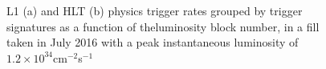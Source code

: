 \documentclass[a4paper, oneside]{book}
\begin{document}
					\begin{figure}[h!]
						\centering
						 \quad
						\caption{L1 (a) and HLT (b) physics trigger rates grouped by trigger signatures as a function of theluminosity block number, in a fill taken in July 2016 with a peak instantaneous luminosity of $1.2 \times 10^{34}$cm$^{-2}$s$^{-1}$}
						\label{fig:Trigger system}
					\end{figure}
\end{document}
